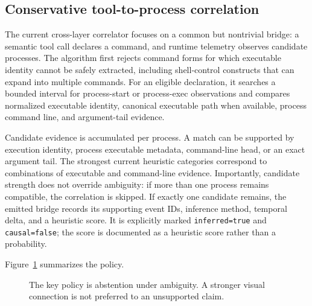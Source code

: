 \subsection{Conservative tool-to-process correlation}
The current cross-layer correlator focuses on a common but nontrivial bridge: a semantic tool call declares a command, and runtime telemetry observes candidate processes. The algorithm first rejects command forms for which executable identity cannot be safely extracted, including shell-control constructs that can expand into multiple commands. For an eligible declaration, it searches a bounded interval for process-start or process-exec observations and compares normalized executable identity, canonical executable path when available, process command line, and argument-tail evidence.

Candidate evidence is accumulated per process. A match can be supported by execution identity, process executable metadata, command-line head, or an exact argument tail. The strongest current heuristic categories correspond to combinations of executable and command-line evidence. Importantly, candidate strength does not override ambiguity: if more than one process remains compatible, the correlation is skipped. If exactly one candidate remains, the emitted bridge records its supporting event IDs, inference method, temporal delta, and a heuristic score. It is explicitly marked \texttt{inferred=true} and \texttt{causal=false}; the score is documented as a heuristic score rather than a probability.

Figure~\ref{fig:corr} summarizes the policy.

\begin{figure}[t]
\centering
{}
\caption{The key policy is abstention under ambiguity. A stronger visual connection is not preferred to an unsupported claim.}
\label{fig:corr}
\end{figure}

